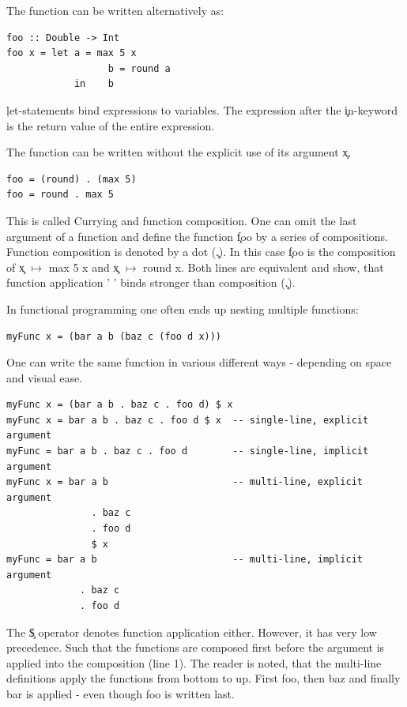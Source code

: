     The function can be written alternatively as:
    \begin{lstlisting}
foo :: Double -> Int
foo x = let a = max 5 x
                  b = round a
            in    b
    \end{lstlisting}
    \c{let}-statements bind expressions to variables.
    The expression after the \c{in}-keyword is the return value of the
    entire expression.
    
    The function can be written without the explicit use of its argument \c{x}.
    \begin{lstlisting}
foo = (round) . (max 5)
foo = round . max 5
    \end{lstlisting}
    This is called Currying and function composition.
    One can omit the last argument of a function and define the function
    \c{foo} by a series of compositions.
    Function composition is denoted by a dot (\c{.}).
    In this case \c{foo} is the composition
    of \c{x $\mapsto$ max 5 x} and \c{x $\mapsto$ round x}.
    Both lines are equivalent and show, that function application ' '
    binds stronger than composition (\c{.}).
    
    In functional programming one often ends up nesting multiple functions:
    \begin{lstlisting}
myFunc x = (bar a b (baz c (foo d x)))
    \end{lstlisting}
    One can write the same function in various different ways - depending on space
    and visual ease.
    \begin{lstlisting}
myFunc x = (bar a b . baz c . foo d) $ x
myFunc x = bar a b . baz c . foo d $ x  -- single-line, explicit argument
myFunc = bar a b . baz c . foo d        -- single-line, implicit argument
myFunc x = bar a b                      -- multi-line, explicit argument
               . baz c 
               . foo d
               $ x
myFunc = bar a b                        -- multi-line, implicit argument
             . baz c
             . foo d
    \end{lstlisting}
    The \c{\$} operator denotes function application either.
    However, it
    has very low precedence. Such that the functions are composed first
    before the argument is applied into the composition (line 1).
    The reader is noted, that the multi-line definitions apply
    the functions from bottom to up. First foo, then baz
    and finally bar is applied - even though foo is written last.
    
